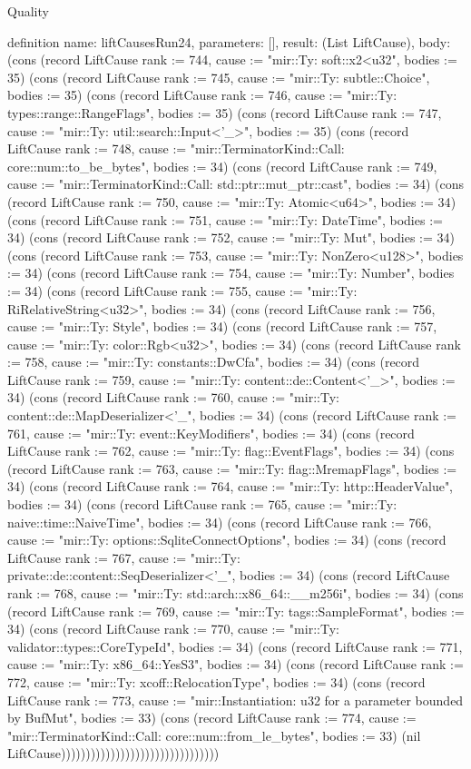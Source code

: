 \begin{lexlean}{Quality}
\begin{semanticmodule}
definition{
  name: liftCausesRun24,
  parameters: [],
  result: (List LiftCause),
  body: (cons (record LiftCause {rank := 744, cause := "mir::Ty: soft::x2<u32", bodies := 35}) (cons (record LiftCause {rank := 745, cause := "mir::Ty: subtle::Choice", bodies := 35}) (cons (record LiftCause {rank := 746, cause := "mir::Ty: types::range::RangeFlags", bodies := 35}) (cons (record LiftCause {rank := 747, cause := "mir::Ty: util::search::Input<'_>", bodies := 35}) (cons (record LiftCause {rank := 748, cause := "mir::TerminatorKind::Call: core::num::to_be_bytes", bodies := 34}) (cons (record LiftCause {rank := 749, cause := "mir::TerminatorKind::Call: std::ptr::mut_ptr::cast", bodies := 34}) (cons (record LiftCause {rank := 750, cause := "mir::Ty: Atomic<u64>", bodies := 34}) (cons (record LiftCause {rank := 751, cause := "mir::Ty: DateTime", bodies := 34}) (cons (record LiftCause {rank := 752, cause := "mir::Ty: Mut", bodies := 34}) (cons (record LiftCause {rank := 753, cause := "mir::Ty: NonZero<u128>", bodies := 34}) (cons (record LiftCause {rank := 754, cause := "mir::Ty: Number", bodies := 34}) (cons (record LiftCause {rank := 755, cause := "mir::Ty: RiRelativeString<u32>", bodies := 34}) (cons (record LiftCause {rank := 756, cause := "mir::Ty: Style", bodies := 34}) (cons (record LiftCause {rank := 757, cause := "mir::Ty: color::Rgb<u32>", bodies := 34}) (cons (record LiftCause {rank := 758, cause := "mir::Ty: constants::DwCfa", bodies := 34}) (cons (record LiftCause {rank := 759, cause := "mir::Ty: content::de::Content<'_>", bodies := 34}) (cons (record LiftCause {rank := 760, cause := "mir::Ty: content::de::MapDeserializer<'_", bodies := 34}) (cons (record LiftCause {rank := 761, cause := "mir::Ty: event::KeyModifiers", bodies := 34}) (cons (record LiftCause {rank := 762, cause := "mir::Ty: flag::EventFlags", bodies := 34}) (cons (record LiftCause {rank := 763, cause := "mir::Ty: flag::MremapFlags", bodies := 34}) (cons (record LiftCause {rank := 764, cause := "mir::Ty: http::HeaderValue", bodies := 34}) (cons (record LiftCause {rank := 765, cause := "mir::Ty: naive::time::NaiveTime", bodies := 34}) (cons (record LiftCause {rank := 766, cause := "mir::Ty: options::SqliteConnectOptions", bodies := 34}) (cons (record LiftCause {rank := 767, cause := "mir::Ty: private::de::content::SeqDeserializer<'_", bodies := 34}) (cons (record LiftCause {rank := 768, cause := "mir::Ty: std::arch::x86_64::__m256i", bodies := 34}) (cons (record LiftCause {rank := 769, cause := "mir::Ty: tags::SampleFormat", bodies := 34}) (cons (record LiftCause {rank := 770, cause := "mir::Ty: validator::types::CoreTypeId", bodies := 34}) (cons (record LiftCause {rank := 771, cause := "mir::Ty: x86_64::YesS3", bodies := 34}) (cons (record LiftCause {rank := 772, cause := "mir::Ty: xcoff::RelocationType", bodies := 34}) (cons (record LiftCause {rank := 773, cause := "mir::Instantiation: u32 for a parameter bounded by BufMut", bodies := 33}) (cons (record LiftCause {rank := 774, cause := "mir::TerminatorKind::Call: core::num::from_le_bytes", bodies := 33}) (nil LiftCause))))))))))))))))))))))))))))))))
}


\end{semanticmodule}
\end{lexlean}
